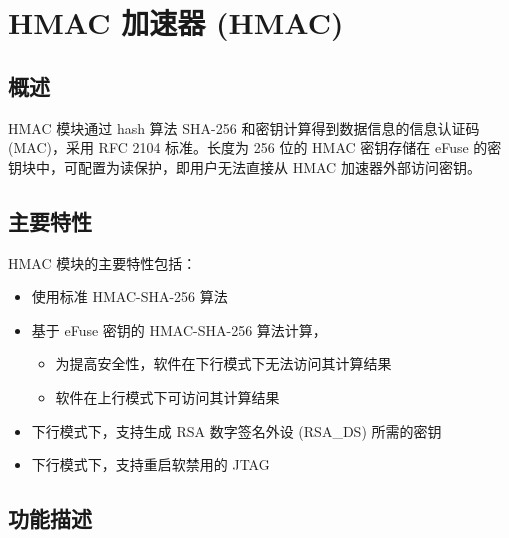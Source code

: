 \documentclass[main\_\_CN.tex]{subfiles}
\begin{document}
\setchineseformatting


\ifglobal
\else
    \clearpage
    \listoftodos
    \listofdonetodos
    \tableofcontents
\fi



\hypertarget{hmac}{}
\chapter{HMAC 加速器 (HMAC)}
\label{mod:hmac}

\section{概述}

HMAC 模块通过 hash 算法 SHA-256 和密钥计算得到数据信息的信息认证码 (MAC)，采用 RFC 2104 标准。长度为 256 位的 HMAC 密钥存储在 eFuse 的密钥块中，可配置为读保护，即用户无法直接从 HMAC 加速器外部访问密钥。

\section{主要特性}

HMAC 模块的主要特性包括：

\begin{itemize}
    \item 使用标准 HMAC-SHA-256 算法
    \item 基于 eFuse 密钥的 HMAC-SHA-256 算法计算，
    \begin{itemize}
    \item 为提高安全性，软件在下行模式下无法访问其计算结果
    \item 软件在上行模式下可访问其计算结果
    \end{itemize}
    \item 下行模式下，支持生成 RSA 数字签名外设 (RSA\_DS) 所需的密钥
    \item 下行模式下，支持重启软禁用的 JTAG
\end{itemize}

\section{功能描述}
\end{document}
